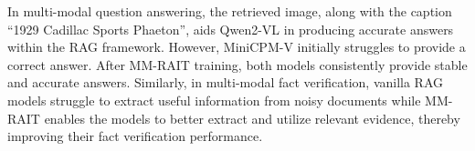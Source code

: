 In multi-modal question answering, the retrieved image, along with the caption ``1929 Cadillac Sports Phaeton'', aids Qwen2-VL in producing accurate answers within the RAG framework. However, MiniCPM-V initially struggles to provide a correct answer. After MM-RAIT training, both models consistently provide stable and accurate answers. Similarly, in multi-modal fact verification, vanilla RAG models struggle to extract useful information from noisy documents while MM-RAIT enables the models to better extract and utilize relevant evidence, thereby improving their fact verification performance.

